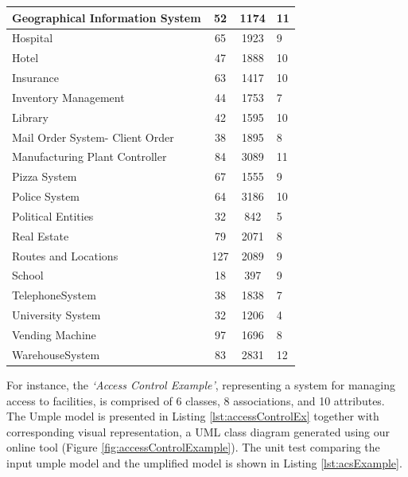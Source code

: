 \begin{table}
\begin{tabularx}{\textwidth}{l|SSX}
Geographical Information System & 52 & 1174 & 11\\ \hline
Hospital & 65 & 1923 & 9\\ \hline
Hotel & 47 & 1888 & 10\\ \hline
Insurance & 63 & 1417 & 10\\ \hline
Inventory Management & 44 & 1753 & 7\\ \hline
Library & 42 & 1595 & 10\\ \hline
Mail Order System- Client Order & 38 & 1895 & 8\\ \hline
Manufacturing Plant Controller & 84 & 3089 & 11\\ \hline
Pizza System & 67 & 1555 & 9 \\ \hline
Police System & 64 & 3186 & 10\\ \hline
Political Entities & 32 & 842 & 5\\ \hline
Real Estate & 79 & 2071 & 8\\ \hline
Routes and Locations & 127 & 2089 & 9\\ \hline
School & 18 & 397 & 9\\ \hline
TelephoneSystem & 38 & 1838 & 7\\ \hline
University System & 32 & 1206 & 4\\ \hline
Vending Machine & 97 & 1696 & 8\\ \hline
WarehouseSystem & 83 & 2831 & 12\\ \hline
\hline
\end{tabularx}
\end{table}

For instance, the \textit{`Access Control Example'}, representing a system for managing access to facilities, is comprised of 6 classes, 8 associations, and 10 attributes. The Umple model is presented in Listing \ref{lst:accessControlEx} together with corresponding visual representation, a UML class diagram generated using our online tool (Figure \ref{fig:accessControlExample}). The unit test comparing the input umple model and the umplified model is shown in Listing \ref{lst:acsExample}.

